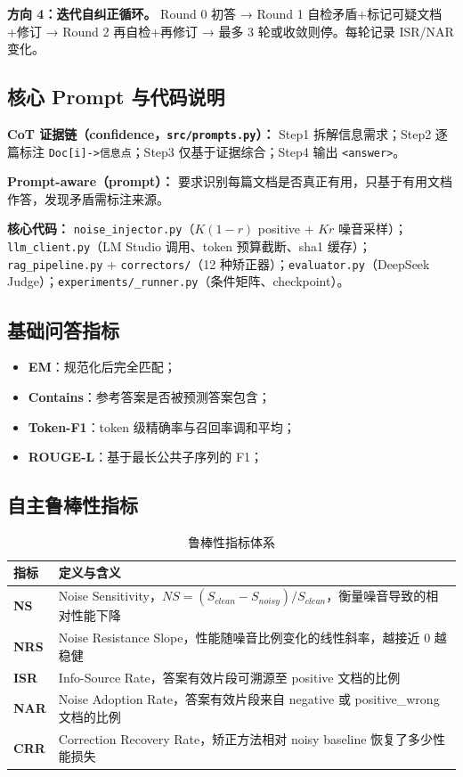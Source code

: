 \documentclass[UTF8,zihao=-4]{ctexart}
\newcommand{\metric}[1]{\textbf{\textcolor{sduBlue}{#1}}}
\begin{document}
\textbf{方向 4：迭代自纠正循环。} Round 0 初答 → Round 1 自检矛盾+标记可疑文档+修订 → Round 2 再自检+再修订 → 最多 3 轮或收敛则停。每轮记录 ISR/NAR 变化。




\subsection{核心 Prompt 与代码说明}
\textbf{CoT 证据链（confidence，\texttt{src/prompts.py}）：} Step1 拆解信息需求；Step2 逐篇标注 \texttt{Doc[i]->信息点}；Step3 仅基于证据综合；Step4 输出 \texttt{<answer>}。

\textbf{Prompt-aware（prompt）：} 要求识别每篇文档是否真正有用，只基于有用文档作答，发现矛盾需标注来源。

\textbf{核心代码：} \texttt{noise\_injector.py}（$K(1-r)$ positive + $Kr$ 噪音采样）；\texttt{llm\_client.py}（LM Studio 调用、token 预算截断、sha1 缓存）；\texttt{rag\_pipeline.py} + \texttt{correctors/}（12 种矫正器）；\texttt{evaluator.py}（DeepSeek Judge）；\texttt{experiments/\_runner.py}（条件矩阵、checkpoint）。

\subsection{基础问答指标}

\begin{itemize}
  \item \metric{EM}：规范化后完全匹配；
  \item \metric{Contains}：参考答案是否被预测答案包含；
  \item \metric{Token-F1}：token 级精确率与召回率调和平均；
  \item \metric{ROUGE-L}：基于最长公共子序列的 F1；
\end{itemize}

\subsection{自主鲁棒性指标}

\begin{table}[H]
  \centering
  \caption{鲁棒性指标体系}
  \begin{tabularx}{\textwidth}{lY}
    \toprule
    指标 & 定义与含义 \\
    \midrule
    \metric{NS} & Noise Sensitivity，$NS=(S_{clean}-S_{noisy})/S_{clean}$，衡量噪音导致的相对性能下降 \\
    \metric{NRS} & Noise Resistance Slope，性能随噪音比例变化的线性斜率，越接近 0 越稳健 \\
    \metric{ISR} & Info-Source Rate，答案有效片段可溯源至 positive 文档的比例 \\
    \metric{NAR} & Noise Adoption Rate，答案有效片段来自 negative 或 positive\_wrong 文档的比例 \\
    \metric{CRR} & Correction Recovery Rate，矫正方法相对 noisy baseline 恢复了多少性能损失 \\
    \bottomrule
  \end{tabularx}
\end{table}
\end{document}

